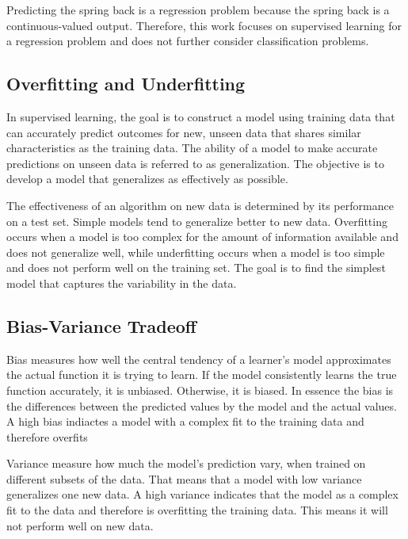 Predicting the spring back is a regression problem because the spring back is a
continuous-valued
output.
Therefore, this work focuses on supervised learning for a regression problem and does
not further
consider classification problems.

\subsection{Overfitting and Underfitting}\label{subsec:overfitting-and-underfitting}
In supervised learning, the goal is to construct a model using training data that can
accurately
predict outcomes for new, unseen data that shares similar characteristics as the
training data.
The ability of a model to make accurate predictions on unseen data is referred to as
generalization. The objective is to develop a model that generalizes as effectively as
possible.
\cite[p. 35]{muller_introductionmachinelearning_2016}

The effectiveness of an algorithm on new data is determined by its performance on a
test set.
Simple models tend to generalize better to new data. Overfitting occurs when a model is
too
complex for the amount of information available and does not generalize well, while
underfitting
occurs when a model is too simple and does not perform well on the training set. The
goal is to
find the simplest model that captures the variability in the data.
\cite[p. 35]{muller_introductionmachinelearning_2016}

\subsection{Bias-Variance Tradeoff}\label{subsec:bias-variance-tradeoff}
Bias measures how well the central tendency of a learner's model approximates the
actual function
it is trying to learn. If the model consistently learns the true function accurately,
it is
unbiased. Otherwise, it is biased. \cite[p. 7-8]{neal_biasvariancetradeofftextbooks_2019}
In essence the bias is the differences between the predicted values by the model and
the actual
values.
A high bias indiactes a model with a complex fit to the training data and therefore
overfits
\cite[p. 20]{neal_biasvariancetradeofftextbooks_2019}

Variance measure how much the model's prediction vary, when trained on different
subsets of the
data. That means that a model with low variance generalizes one new data. A high variance
indicates that the model as a complex fit to the data and therefore is overfitting the
training
data. This means it will not perform well on new data. \cite[p.
7-8]{neal_biasvariancetradeofftextbooks_2019}

